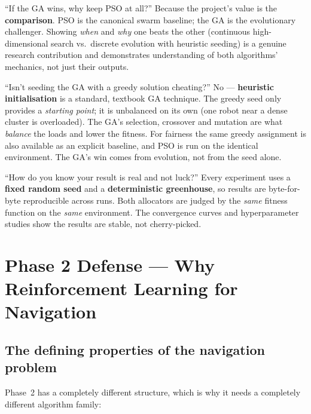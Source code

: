 \documentclass[11pt]{article}
\begin{document}
\begin{qbox}{``If the GA wins, why keep PSO at all?''}
Because the project's value is the \textbf{comparison}. PSO is the canonical
swarm baseline; the GA is the evolutionary challenger. Showing \emph{when} and
\emph{why} one beats the other (continuous high-dimensional search vs.\ discrete
evolution with heuristic seeding) is a genuine research contribution and
demonstrates understanding of both algorithms' mechanics, not just their outputs.
\end{qbox}

\begin{qbox}{``Isn't seeding the GA with a greedy solution cheating?''}
No --- \textbf{heuristic initialisation} is a standard, textbook GA technique. The
greedy seed only provides a \emph{starting point}; it is unbalanced on its own
(one robot near a dense cluster is overloaded). The GA's selection, crossover and
mutation are what \emph{balance} the loads and lower the fitness. For fairness the
same greedy assignment is also available as an explicit baseline, and PSO is run
on the identical environment. The GA's win comes from evolution, not from the
seed alone.
\end{qbox}

\begin{qbox}{``How do you know your result is real and not luck?''}
Every experiment uses a \textbf{fixed random seed} and a \textbf{deterministic
greenhouse}, so results are byte-for-byte reproducible across runs. Both
allocators are judged by the \emph{same} fitness function on the \emph{same}
environment. The convergence curves and hyperparameter studies show the results
are stable, not cherry-picked.
\end{qbox}

\section{Phase 2 Defense --- Why Reinforcement Learning for Navigation}

\subsection{The defining properties of the navigation problem}
Phase~2 has a completely different structure, which is why it needs a completely
different algorithm family:
\end{document}
